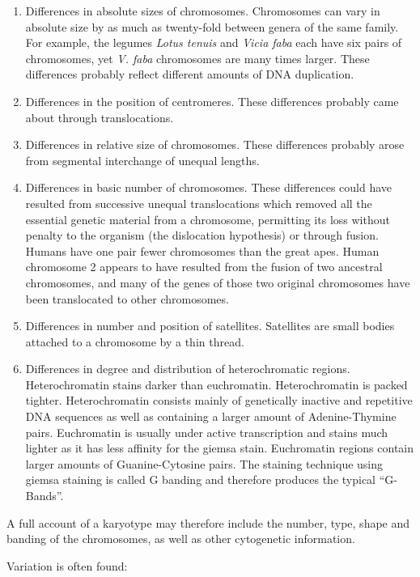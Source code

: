 \documentclass[]{book}
\providecommand{\tightlist}{%
  \setlength{\itemsep}{0pt}\setlength{\parskip}{0pt}}
\begin{document}
\begin{enumerate}
\def\labelenumi{\arabic{enumi}.}
\tightlist
\item
  Differences in absolute sizes of chromosomes. Chromosomes can vary in
  absolute size by as much as twenty-fold between genera of the same
  family. For example, the legumes \emph{Lotus tenuis} and \emph{Vicia
  faba} each have six pairs of chromosomes, yet \emph{V. faba}
  chromosomes are many times larger. These differences probably reflect
  different amounts of DNA duplication.
\item
  Differences in the position of centromeres. These differences probably
  came about through translocations.
\item
  Differences in relative size of chromosomes. These differences
  probably arose from segmental interchange of unequal lengths.
\item
  Differences in basic number of chromosomes. These differences could
  have resulted from successive unequal translocations which removed all
  the essential genetic material from a chromosome, permitting its loss
  without penalty to the organism (the dislocation hypothesis) or
  through fusion. Humans have one pair fewer chromosomes than the great
  apes. Human chromosome 2 appears to have resulted from the fusion of
  two ancestral chromosomes, and many of the genes of those two original
  chromosomes have been translocated to other chromosomes.
\item
  Differences in number and position of satellites. Satellites are small
  bodies attached to a chromosome by a thin thread.
\item
  Differences in degree and distribution of heterochromatic regions.
  Heterochromatin stains darker than euchromatin. Heterochromatin is
  packed tighter. Heterochromatin consists mainly of genetically
  inactive and repetitive DNA sequences as well as containing a larger
  amount of Adenine-Thymine pairs. Euchromatin is usually under active
  transcription and stains much lighter as it has less affinity for the
  giemsa stain. Euchromatin regions contain larger amounts of
  Guanine-Cytosine pairs. The staining technique using giemsa staining
  is called G banding and therefore produces the typical ``G-Bands''.
\end{enumerate}

A full account of a karyotype may therefore include the number, type,
shape and banding of the chromosomes, as well as other cytogenetic
information.

Variation is often found:
\end{document}
